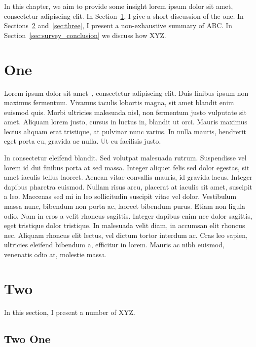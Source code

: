 In this chapter, we aim to provide some insight lorem ipsum dolor sit amet, consectetur adipiscing elit. In Section~\ref{sec:one}, I give a short discussion of the one. In Sections~\ref{sec:two} and~\ref{sec:three}, I present a non-exhaustive summary of ABC. In Section~\ref{sec:survey_conclusion} we discuss how XYZ. \newline

\section{One}
\label{sec:one}

Lorem ipsum dolor sit amet~\cite{Berghel2007aa,Bidou2005aa,Grusho2005aa,Helouet2005aa,Patel2007aa,Petitcolas1999aa,Sartin2006aa,Zander2007aa}, consectetur adipiscing elit. Duis finibus ipsum non maximus fermentum. Vivamus iaculis lobortis magna, sit amet blandit enim euismod quis. Morbi ultricies malesuada nisl, non fermentum justo vulputate sit amet. Aliquam lorem justo, cursus in luctus in, blandit ut orci. Mauris maximus lectus aliquam erat tristique, at pulvinar nunc varius. In nulla mauris, hendrerit eget porta eu, gravida ac nulla. Ut eu facilisis justo. \newline

In consectetur eleifend blandit. Sed volutpat malesuada rutrum. Suspendisse vel lorem id dui finibus porta at sed massa. Integer aliquet felis sed dolor egestas, sit amet iaculis tellus laoreet. Aenean vitae convallis mauris, id gravida lacus. Integer dapibus pharetra euismod. Nullam risus arcu, placerat at iaculis sit amet, suscipit a leo. Maecenas sed mi in leo sollicitudin suscipit vitae vel dolor. Vestibulum massa nunc, bibendum non porta ac, laoreet bibendum purus. Etiam non ligula odio. Nam in eros a velit rhoncus sagittis. Integer dapibus enim nec dolor sagittis, eget tristique dolor tristique. In malesuada velit diam, in accumsan elit rhoncus nec. Aliquam rhoncus elit lectus, vel dictum tortor interdum ac. Cras leo sapien, ultricies eleifend bibendum a, efficitur in lorem. Mauris ac nibh euismod, venenatis odio at, molestie massa.


\section{Two}
\label{sec:two}

In this section, I present a number of XYZ.

\subsection{Two One}
\label{sub:two_one}

